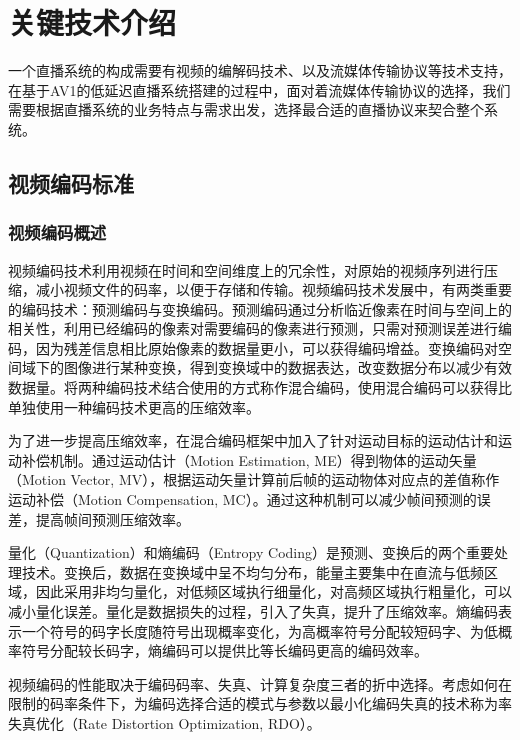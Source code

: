 
\chapter{关键技术介绍}

一个直播系统的构成需要有视频的编解码技术、以及流媒体传输协议等技术支持，在基于AV1的低延迟直播系统搭建的过程中，面对着流媒体传输协议的选择，我们需要根据直播系统的业务特点与需求出发，选择最合适的直播协议来契合整个系统。

\section{视频编码标准}

\subsection{视频编码概述}

视频编码技术利用视频在时间和空间维度上的冗余性，对原始的视频序列进行压缩，减小视频文件的码率，以便于存储和传输。视频编码技术发展中，有两类重要的编码技术：预测编码与变换编码。预测编码通过分析临近像素在时间与空间上的相关性，利用已经编码的像素对需要编码的像素进行预测，只需对预测误差进行编码，因为残差信息相比原始像素的数据量更小，可以获得编码增益。变换编码对空间域下的图像进行某种变换，得到变换域中的数据表达，改变数据分布以减少有效数据量。将两种编码技术结合使用的方式称作混合编码，使用混合编码可以获得比单独使用一种编码技术更高的压缩效率。

为了进一步提高压缩效率，在混合编码框架中加入了针对运动目标的运动估计和运动补偿机制。通过运动估计（Motion Estimation, ME）得到物体的运动矢量（Motion Vector, MV），根据运动矢量计算前后帧的运动物体对应点的差值称作运动补偿（Motion Compensation, MC）。通过这种机制可以减少帧间预测的误差，提高帧间预测压缩效率。

量化（Quantization）和熵编码（Entropy Coding）是预测、变换后的两个重要处理技术。变换后，数据在变换域中呈不均匀分布，能量主要集中在直流与低频区域，因此采用非均匀量化，对低频区域执行细量化，对高频区域执行粗量化，可以减小量化误差。量化是数据损失的过程，引入了失真，提升了压缩效率。熵编码表示一个符号的码字长度随符号出现概率变化，为高概率符号分配较短码字、为低概率符号分配较长码字，熵编码可以提供比等长编码更高的编码效率。

视频编码的性能取决于编码码率、失真、计算复杂度三者的折中选择。考虑如何在限制的码率条件下，为编码选择合适的模式与参数以最小化编码失真的技术称为率失真优化\cite{sullivanRatedistortionOptimizationVideo1998}（Rate Distortion Optimization, RDO）。


